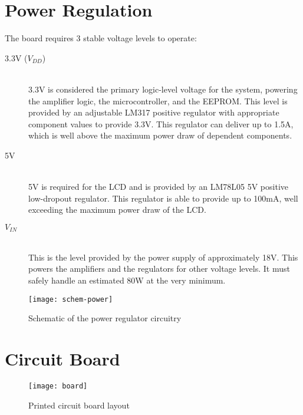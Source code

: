 \section{Power Regulation}
The board requires 3 stable voltage levels to operate:
\begin{description}
\item[3.3V ($V_{DD}$)] \hfill \\
3.3V is considered the primary logic-level voltage for the system, powering the amplifier logic, the microcontroller, and the EEPROM. This level is provided by an adjustable LM317 positive regulator with appropriate component values to provide 3.3V. This regulator can deliver up to 1.5A, which is well above the maximum power draw of dependent components. 
\item[5V] \hfill \\
5V is required for the LCD and is provided by an LM78L05 5V positive low-dropout regulator. This regulator is able to provide up to 100mA, well exceeding the maximum power draw of the LCD.
\item[$V_{IN}$] \hfill \\
This is the level provided by the power supply of approximately 18V. This powers the amplifiers and the regulators for other voltage levels. It must safely handle an estimated 80W at the very minimum.
\end{description}

\begin{figure}[H]
	\centering
	\texttt{[image: schem-power]}
	\caption[Power Regulation]%
	{Schematic of the power regulator circuitry}
\end{figure}

\section{Circuit Board}
\begin{figure}[H]
	\centering
	\texttt{[image: board]}
	\caption[PCB Layout]%
	{Printed circuit board layout}
\end{figure}
